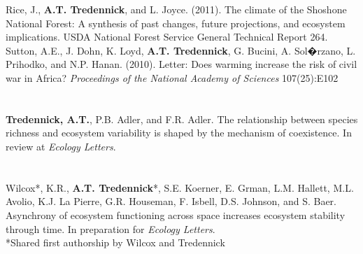 \documentclass[margin,line]{resume}
\begin{document}
\begin{resume}
   Rice, J., \textbf{A.T. Tredennick}, and L. Joyce. (2011). The climate of the Shoshone National Forest: A synthesis of past changes, future projections, and 			ecosystem implications. USDA National Forest Service General Technical Report 264. \vspace{-6mm}\\%
	
	Sutton, A.E., J. Dohn, K. Loyd, \textbf{A.T. Tredennick}, G. Bucini, A. Sol�rzano, L. Prihodko, and N.P. Hanan. (2010). Letter: Does warming increase the risk of civil war 	in Africa? \textsl{Proceedings of the National Academy of Sciences} 107(25):E102 \\ 
		
	\section{\textmd{\textsf{}}}
	\textbf{Tredennick, A.T.}, P.B. Adler, and F.R. Adler. The relationship between species richness and ecosystem variability is shaped by the mechanism of coexistence. In review at \emph{Ecology Letters}.
	
	\section{\textmd{\textsf{}}}
    Wilcox*, K.R., \textbf{A.T. Tredennick}*, S.E. Koerner, E. Grman, L.M. Hallett, M.L. Avolio, K.J. La Pierre, G.R. Houseman, F. Isbell, D.S. Johnson, and S. Baer. Asynchrony of ecosystem functioning across space increases ecosystem stability through time. In preparation for \emph{Ecology Letters}. \\%
    \hspace{2em} \textsf{\footnotesize{*Shared first authorship by Wilcox and Tredennick}} \vspace{-6mm}\\%
    

\end{resume}
\end{document}
